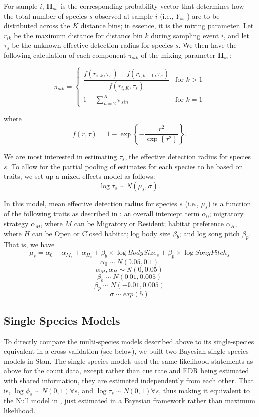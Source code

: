 \documentclass[12pt]{article}
\begin{document}
\par For sample $i$, $\mathbf{\Pi}_{si.}$ is the corresponding probability vector that determines how the total number of species $s$ observed at sample $i$ (i.e., $Y_{si..}$) are to be distributed across the $K$ distance bins; in essence, it is the mixing parameter. 
Let $r_{ik}$ be the maximum distance for distance bin $k$ during sampling event $i$, and let $\tau_s$ be the unknown effective detection radius for species $s$. 
We then have the following calculation of each component $\pi_{sik}$ of the mixing parameter $\mathbf{\Pi}_{si.}$:

\begin{equation*}
	\pi_{sik} = 
	\begin{cases}
		\dfrac{f(r_{i,k}, \tau_s) - f(r_{i,k-1}, \tau_s)}{f(r_{i,K}, \tau_s)} & \text{for } k > 1 \\
		1 - \sum_{n = 2}^{K} \pi_{sin} & \text{for } k = 1
	\end{cases}
\end{equation*}

where 
$$f(r,\tau) =  1 - \exp\left\{ -\dfrac{r^2}{\exp\left\{\tau^2\right\}} \right\} .$$

\par We are most interested in estimating $\tau_s$, the effective detection radius for species $s$. 
To allow for the partial pooling of estimates for each species to be based on traits, we set up a mixed effects model as follows:
$$\log \tau_s \sim N(\mu_s, \sigma).$$

\par In this model, mean effective detection radius for species $s$ (i.e., $\mu_s$) is a function of the following traits as described in \cite{solymos_phylogeny_2018}: an overall intercept term $\alpha_0$; migratory strategy $\alpha_M$, where $M$ can be Migratory or Resident; habitat preference $\alpha_H$, where $H$ can be Open or Closed habitat; log body size $\beta_b$; and log song pitch $\beta_p$. 
That is, we have
$$ \mu_s = \alpha_0 + \alpha_{M_s} + \alpha_{H_s} + \beta_b \times \log BodySize_s + \beta_p \times \log SongPitch_s$$
$$\alpha_0 \sim N(0.05, 0.1)$$
$$ \alpha_M, \alpha_H \sim N(0, 0.05)$$
$$ \beta_b \sim N(0.01, 0.005)$$
$$ \beta_p \sim N(-0.01, 0.005) $$
$$\sigma \sim exp(5)$$

\subsection{Single Species Models}

\par To directly compare the multi-species models described above to its single-species equivalent in a cross-validation (see below), we built two Bayesian single-species models in Stan.
The single species models used the same likelihood statements as above for the count data, except rather than cue rate and EDR being estimated with shared information, they are estimated independently from each other.
That is, $\log \phi_s \sim N(0,1) \forall s$, and $\log \tau_s \sim N(0,1) \forall s$, thus making it equivalent to the Null model in \citet{edwards_point_2023}, just estimated in a Bayesian framework rather than maximum likelihood. 
\end{document}
